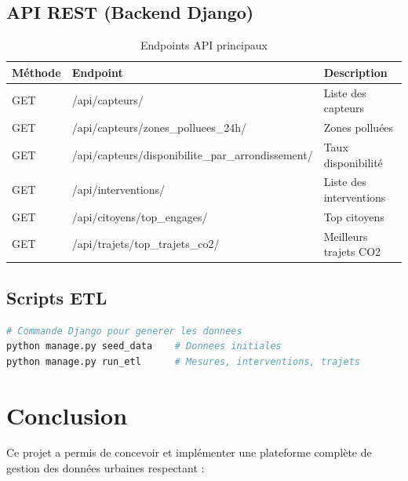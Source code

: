 \documentclass[12pt,a4paper]{article}
\begin{document}
\subsection{API REST (Backend Django)}

\begin{table}[h]
\centering
\begin{tabular}{|l|l|l|}
\hline
\textbf{Méthode} & \textbf{Endpoint} & \textbf{Description} \\
\hline
GET & /api/capteurs/ & Liste des capteurs \\
GET & /api/capteurs/zones\_polluees\_24h/ & Zones polluées \\
GET & /api/capteurs/disponibilite\_par\_arrondissement/ & Taux disponibilité \\
GET & /api/interventions/ & Liste des interventions \\
GET & /api/citoyens/top\_engages/ & Top citoyens \\
GET & /api/trajets/top\_trajets\_co2/ & Meilleurs trajets CO2 \\
\hline
\end{tabular}
\caption{Endpoints API principaux}
\end{table}

\subsection{Scripts ETL}

\begin{lstlisting}[language=Python]
# Commande Django pour generer les donnees
python manage.py seed_data    # Donnees initiales
python manage.py run_etl      # Mesures, interventions, trajets
\end{lstlisting}

\section{Conclusion}

Ce projet a permis de concevoir et implémenter une plateforme complète de gestion des données urbaines respectant :
\end{document}

